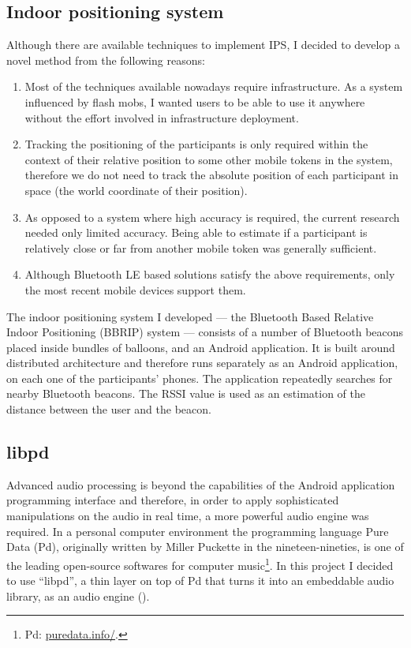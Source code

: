 \documentclass[a4paper,11pt]{article}
\begin{document}
\subsection{Indoor positioning system}\label{methods:ips}

Although there are available techniques to implement IPS, I decided to develop a novel method from the following reasons:

\begin{enumerate}
	\item Most of the techniques available nowadays require infrastructure.
	As a system influenced by flash mobs, I wanted users to be able to use it anywhere without the effort involved in infrastructure deployment.
	\item Tracking the positioning of the participants is only required within the context of their relative position to some other mobile tokens in the system, therefore we do not need to track the absolute position of each participant in space (the world coordinate of their position).
	\item As opposed to a system where high accuracy is required, the current research needed only limited accuracy.
	Being able to estimate if a participant is relatively close or far from another mobile token was generally sufficient.
	\item Although Bluetooth LE based solutions satisfy the above requirements, only the most recent mobile devices support them.
\end{enumerate}

The indoor positioning system I developed --- the Bluetooth Based Relative Indoor Positioning (BBRIP) system --- consists of a number of Bluetooth beacons placed inside bundles of balloons, and an Android application.
It is built around distributed architecture and therefore runs separately as an Android application, on each one of the participants' phones.
The application repeatedly searches for nearby Bluetooth beacons.
The RSSI value is used as an estimation of the distance between the user and the beacon.

\subsection{libpd}\label{methods:libpd}

Advanced audio processing is beyond the capabilities of the Android application programming interface and therefore, in order to apply sophisticated manipulations on the audio in real time, a more powerful audio engine was required.
In a personal computer environment the programming language Pure Data (Pd), originally written by Miller Puckette in the nineteen-nineties, is one of the leading open-source softwares for computer music\footnote{Pd: \href{http://puredata.info/}{puredata.info/}.}.
In this project I decided to use ``libpd'', a thin layer on top of Pd that turns it into an embeddable audio library, as an audio engine (\cite[p. v]{brinkmann12}).
\end{document}
